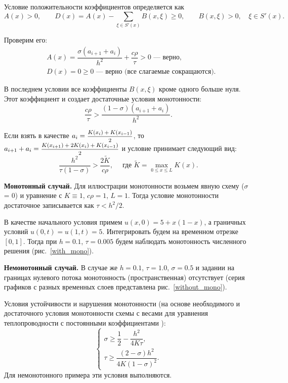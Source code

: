 \documentclass[12pt, a4paper]{article}
\begin{document}
\begin{enumerate}
		Условие положительности коэффициентов определяется как
		\[
		A(x) > 0, \qquad D(x) = A(x) - \sum_{\xi\in S'(x)} B(x, \xi) \ge 0, \qquad B(x, \xi) >0, \quad \xi\in S'(x).
		\]
		
		Проверим его:
		\begin{eqnarray*}
			& A(x) = \dfrac{\sigma (a_{i+1}+a_i)}{h^2} + \dfrac{c\rho}\tau > 0 \text{ --- верно}, \\
			& D(x) = 0 \ge 0 \text{ --- верно (все слагаемые сокращаются)}.
		\end{eqnarray*}
		
		В последнем условии все коэффициенты $B(x, \xi)$ кроме одного больше нуля. Этот коэффициент и создает достаточные условия монотонности:
		\[
		\frac{c\rho}{\tau} > \frac{(1-\sigma)(a_{i+1} + a_i)}{h^2}.
		\]
		
		Если взять в качестве $a_i = \hbox{\footnotesize$\displaystyle\frac{K(x_i) + K(x_{i-1})}{2}$}$, то $a_{i+1}+a_i = \hbox{\footnotesize$\displaystyle\frac{K(x_{i+1})+2K(x_i)+K(x_{i-1})}{2}$}$ и условие принимает следующий вид:
		\[
		\frac{h^2}{\tau (1-\sigma)} > \frac{2 \tilde{K}}{c\rho}, \quad \text{ где } \tilde{K} = \max_{0 \le x \le L} K(x).
		\]
		
		\textbf{Монотонный случай.} Для иллюстрации монотонности возьмем явную схему ($\sigma$ = 0) и уравнение с $K \equiv 1$, $c\rho = 1$, $L = 1$. Тогда условие монотонности достаточное записывается как $\tau < h^2 / 2$.
		
		В качестве начального условия примем $u(x, 0) = 5 + x (1-x)$, а граничных условий $u(0, t) = u(1, t) = 5$. Интегрировать будем на временном отрезке $[0, 1]$. Тогда при $h = 0.1$, $\tau = 0.005$ будем наблюдать монотонность численного решения (рис.~\ref{with_mono}). 
		
		
		\textbf{Немонотонный случай.} В случае же $h = 0.1$, $\tau = 1.0$, $\sigma=0.5$ и задании на границах нулевого потока монотонность (пространственная) отсутствует (серия графиков с разных временных слоев представлена рис.~\ref{without_mono}).
		
		Условия устойчивости и нарушения монотонности (на основе необходимого и достаточного условия монотонности схемы с весами для уравнения теплопроводности с постоянными коэффициентами \cite{kalitkin}):
		\[
		\begin{cases}
			\sigma\ge\dfrac12-\dfrac{h^2}{4K\tau},\\[0.3cm]
			\tau\ge\dfrac{(2-\sigma)h^2}{4K(1-\sigma)^2}.
		\end{cases}
		\]
		Для немонотонного примера эти условия выполняются.
		

\end{enumerate}
\end{document}

